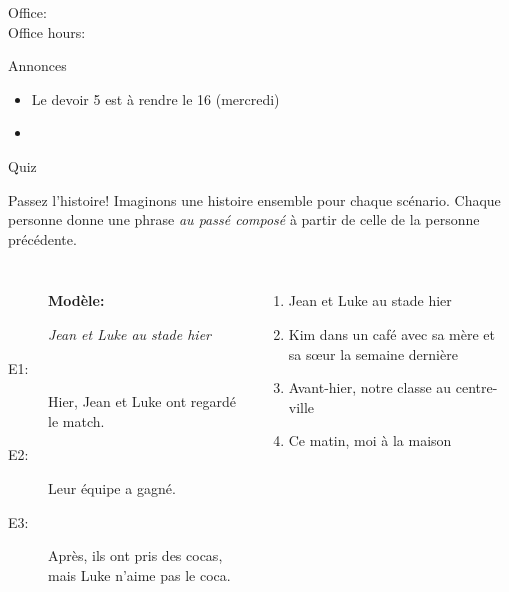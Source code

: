 \documentclass{beamer}
\subtitle[Passé composé (\lexi{avoir})]{Le passé composé avec \lexi{avoir}}
\begin{document}
  \begin{frame}
    \titlepage
    \tiny{Office: \\
          Office hours: }
  \end{frame}

  \begin{frame}{Annonces}
    \begin{itemize}
      \item Le devoir 5 est à rendre le 16 (mercredi)
      \item[] 
    \end{itemize}
  \end{frame}

  \begin{frame}{}
    \begin{center}
      \Large Quiz
    \end{center}
  \end{frame}

  \begin{frame}{Passez l'histoire!}
    Imaginons une histoire ensemble pour chaque scénario.
    Chaque personne donne une phrase \emph{au passé composé} à partir de celle de la personne précédente. \\
    \begin{columns}
        \begin{description}
          \item[] \textbf{Modèle:}
          \item[] \emph{Jean et Luke au stade hier}
          \item[E1:] Hier, Jean et Luke ont regardé le match.
          \item[E2:] Leur équipe a gagné.
          \item[E3:] Après, ils ont pris des cocas, mais Luke n'aime pas le coca.
        \end{description}
        \begin{enumerate}
          \item Jean et Luke au stade hier
          \item Kim dans un café avec sa mère et sa sœur la semaine dernière
          \item Avant-hier, notre classe au centre-ville
          \item Ce matin, moi à la maison
        \end{enumerate}
    \end{columns}
  \end{frame}
\end{document}
